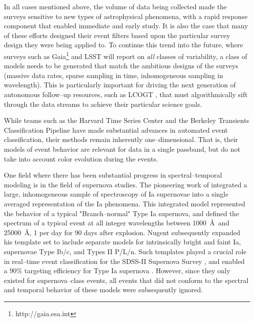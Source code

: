In all cases mentioned above, the volume of data being collected made the
surveys sensitive to new types of astrophysical phenomena, with a rapid response
component that enabled immediate and early study.  It is also the case that many
of these efforts designed their event filters based upon the particular survey
design they were being applied to.  To continue this trend into the future,
where surveys such as Gaia\footnote{http://gaia.esa.int} and LSST will report on
{\it all} classes of variability, a class of models needs to be generated that
match the ambitious designs of the surveys (massive data rates, sparse sampling
in time, inhomogeneous sampling in wavelength).  This is particularly important
for driving the next generation of autonomous follow--up resources, such as
LCOGT \citep{2008AN....329..269H}, that must algorithmically sift through the
data streams to achieve their particular science goals.

 \smallskip

While teams such as the Harvard Time Series Center \citep{X} and the Berkeley
Transients Classification Pipeline \citep{T} have made substantial advances in
automated event classification, their methods remain inherently
one--dimensional. That is, their models of event behavior are relevant for data
in a single passband, but do not take into account color evolution during the
events.

One field where there has been substantial progress in spectral--temporal
modeling is in the field of supernova studies. The pioneering work of
\cite{2002PASP..114..803N} integrated a large, inhomogeneous sample of
spectroscopy of Ia supernovae into a single averaged representation of the Ia
phenomena. This integrated model represented the behavior of a typical
"Branch--normal" Type Ia supernova, and defined the spectrum of a typical event
at all integer wavelengths between 1000~\AA~and 25000~\AA, 1 per day for 90 days
after explosion.  Nugent subsequently expanded his template set to include
separate models for intrinsically bright and faint Ia, supernovae Type Ib/c, and
Types II P/L/n. Such templates played a crucial role in real--time event
classification for the SDSS-II Supernova Survey \citep{2008AJ....135..338F}, and
enabled a $90\%$ targeting efficiency for Type Ia supernova
\citep{2008AJ....135..348S}. However, since they only existed for
supernova--class events, all events that did not conform to the spectral and
temporal behavior of these models were subsequently ignored.

